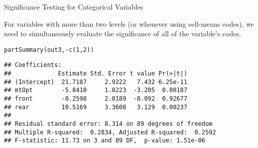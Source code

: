 \documentclass{beamer}\usepackage[]{graphicx}\usepackage[]{color}
\makeatletter
\newcommand{\hlnum}[1]{\textcolor[rgb]{0.69,0.494,0}{#1}}%
\newcommand{\hlopt}[1]{\textcolor[rgb]{0,0,0}{#1}}%
\newcommand{\hlstd}[1]{\textcolor[rgb]{0,0,0}{#1}}%
\newcommand{\hlkwd}[1]{\textcolor[rgb]{0.004,0.004,0.506}{#1}}%
\newenvironment{kframe}{%
 \def\at@end@of@kframe{}%
 \ifinner\ifhmode%
  \def\at@end@of@kframe{\end{minipage}}%
  \begin{minipage}{\columnwidth}%
 \fi\fi%
 \def\FrameCommand##1{\hskip\@totalleftmargin \hskip-\fboxsep
 \colorbox{shadecolor}{##1}\hskip-\fboxsep
     \hskip-\linewidth \hskip-\@totalleftmargin \hskip\columnwidth}%
 \MakeFramed {\advance\hsize-\width
   \@totalleftmargin\z@ \linewidth\hsize
   \@setminipage}}%
 {\par\unskip\endMakeFramed%
 \at@end@of@kframe}
\newenvironment{knitrout}{}{} %
\makeatother
\begin{document}
\begin{frame}[fragile]{Significance Testing for Categorical Variables}
  
  For variables with more than two levels (or whenever using cell-means codes), 
  we need to simultaneously evaluate the significance of all of the variable's 
  codes.
 
\begin{knitrout}\footnotesize
{}\color{fgcolor}\begin{kframe}
\begin{alltt}
\hlkwd{partSummary}\hlstd{(out3,} \hlopt{-}\hlkwd{c}\hlstd{(}\hlnum{1}\hlstd{,} \hlnum{2}\hlstd{))}
\end{alltt}
\begin{verbatim}
## Coefficients:
##             Estimate Std. Error t value Pr(>|t|)
## (Intercept)  21.7187     2.9222   7.432 6.25e-11
## mtOpt        -5.8410     1.8223  -3.205  0.00187
## front        -0.2598     2.8189  -0.092  0.92677
## rear         10.5169     3.3608   3.129  0.00237
## 
## Residual standard error: 8.314 on 89 degrees of freedom
## Multiple R-squared:  0.2834,	Adjusted R-squared:  0.2592 
## F-statistic: 11.73 on 3 and 89 DF,  p-value: 1.51e-06
\end{verbatim}
\end{kframe}
\end{knitrout}
  
\end{frame}


\end{document}
